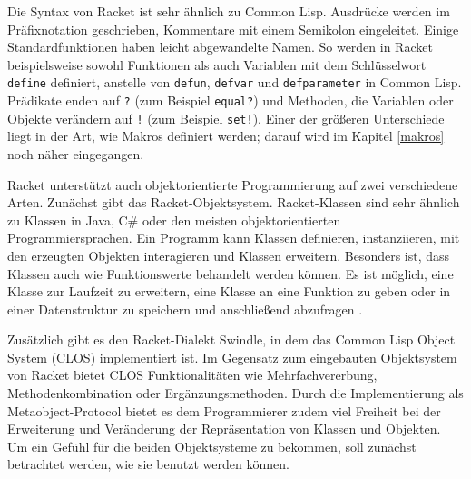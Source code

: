 Die Syntax von Racket ist sehr ähnlich zu Common Lisp. Ausdrücke werden im Präfixnotation geschrieben, Kommentare mit einem Semikolon eingeleitet. Einige Standardfunktionen haben leicht abgewandelte Namen. So werden in Racket beispielsweise sowohl Funktionen als auch Variablen mit dem Schlüsselwort \texttt{define} definiert, anstelle von \texttt{defun}, \texttt{defvar} und \texttt{defparameter} in Common Lisp. Prädikate enden auf \texttt{?} (zum Beispiel \texttt{equal?}) und Methoden, die Variablen oder Objekte verändern auf \texttt{!} (zum Beispiel \texttt{set!}). Einer der größeren Unterschiede liegt in der Art, wie Makros definiert werden; darauf wird im Kapitel \ref{makros} noch näher eingegangen.

Racket unterstützt auch objektorientierte Programmierung auf zwei verschiedene Arten. Zunächst gibt das Racket-Objektsystem. Racket-Klassen sind sehr ähnlich zu Klassen in Java, C\# oder den meisten objektorientierten Programmiersprachen. Ein Programm kann Klassen definieren, instanziieren, mit den erzeugten Objekten interagieren und Klassen erweitern. Besonders ist, dass Klassen auch wie Funktionswerte behandelt werden können. Es ist möglich, eine Klasse zur Laufzeit zu erweitern, eine Klasse an eine Funktion zu geben oder in einer Datenstruktur zu speichern und anschließend abzufragen \cite{neu-edu}. 

Zusätzlich gibt es den Racket-Dialekt Swindle, in dem das Common Lisp Object System (CLOS) implementiert ist. Im Gegensatz zum eingebauten Objektsystem von Racket bietet CLOS Funktionalitäten wie Mehrfachvererbung, Methodenkombination oder Ergänzungsmethoden. Durch die Implementierung als Metaobject-Protocol bietet es dem Programmierer zudem viel Freiheit bei der Erweiterung und Veränderung der Repräsentation von Klassen und Objekten.
Um ein Gefühl für die beiden Objektsysteme zu bekommen, soll zunächst betrachtet werden, wie sie benutzt werden können. %

